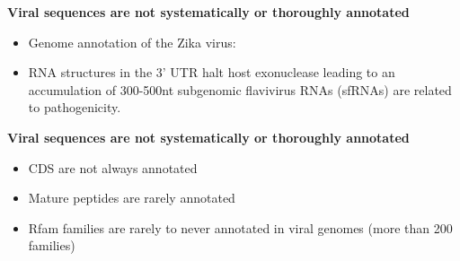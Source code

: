 \documentclass[landscape]{slides}
\begin{document}
\begin{slide}
\begin{center}
\textbf{Viral sequences are not systematically or thoroughly annotated}
\end{center}
\medskip

\small
\begin{itemize}
\item Genome annotation of the Zika virus:
\end{itemize}  


\begin{itemize}
\item RNA structures in the 3' UTR halt host exonuclease leading to an
  accumulation of 300-500nt subgenomic flavivirus RNAs (sfRNAs) are
  related to pathogenicity.
\end{itemize}

\normalsize
{}

\vfill
\tiny {}
\end{slide}
\begin{slide}
\begin{center}
\textbf{Viral sequences are not systematically or thoroughly annotated}
\end{center}

\small
\begin{itemize}
\item CDS are not always annotated
\item Mature peptides are rarely annotated
\item Rfam families are rarely to never annotated in viral genomes
  (more than 200 families)
\end{itemize}

\normalsize
{}

\vfill
\end{slide}
\end{document}
